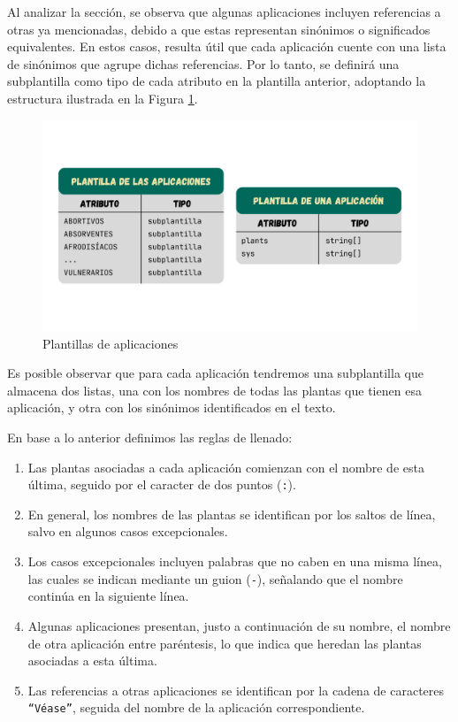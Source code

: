 Al analizar la sección, se observa que algunas aplicaciones incluyen referencias a otras ya mencionadas, 
debido a que estas representan sinónimos o significados equivalentes. En estos casos, resulta útil que 
cada aplicación cuente con una lista de sinónimos que agrupe dichas referencias. Por lo tanto, se definirá 
una subplantilla como tipo de cada atributo en la plantilla anterior, adoptando la estructura ilustrada en 
la Figura \ref{fig:template-app}.

\begin{figure}[ht!]
    \centering
    \includegraphics[width=1\textwidth]{Images/app-template.png}
    \caption{Plantillas de aplicaciones}
    \label{fig:template-app}
\end{figure}

Es posible observar que para cada aplicación tendremos una subplantilla que almacena dos listas, una con los nombres
de todas las plantas que tienen esa aplicación, y otra con los sinónimos identificados en el texto.

En base a lo anterior definimos las reglas de llenado:

\begin{enumerate}
    \item Las plantas asociadas a cada aplicación comienzan con el nombre de esta última, seguido por el caracter de dos puntos (\texttt{:}).
    \item En general, los nombres de las plantas se identifican por los saltos de línea, salvo en algunos casos excepcionales.
    \item Los casos excepcionales incluyen palabras que no caben en una misma línea, las cuales se indican mediante un guion (\texttt{-}), señalando que el nombre continúa en la siguiente línea.
    \item Algunas aplicaciones presentan, justo a continuación de su nombre, el nombre de otra aplicación entre paréntesis, lo que indica que heredan las plantas asociadas a esta última.
    \item Las referencias a otras aplicaciones se identifican por la cadena de caracteres \texttt{``Véase''}, seguida del nombre de la aplicación correspondiente.
\end{enumerate}




